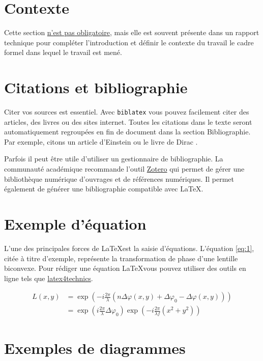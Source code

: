 \documentclass[
    iai, %
    eai, %
]{heig-tb}
\begin{document}
\section{Contexte}
Cette section \underline{n'est pas obligatoire}, mais elle est souvent présente dans un rapport technique pour compléter l'introduction et définir le contexte du travail \cad le cadre formel dans lequel le travail est mené.

\section{Citations et bibliographie}
Citer vos sources est essentiel. Avec \texttt{biblatex} vous pouvez facilement citer des articles, des livres ou des sites internet. Toutes les citations dans le texte seront automatiquement regroupées en fin de document dans la section \guillemotleft Bibliographie\guillemotright. Par exemple, citons un article d'Einstein \cite{einstein} ou le livre de Dirac \cite{dirac}.

Parfois il peut être utile d'utiliser un gestionnaire de bibliographie. La communauté académique recommande l'outil \href{https://www.zotero.org/}{Zotero} qui permet de gérer une bibliothèque numérique d'ouvrages et de références numériques. Il permet également de générer une bibliographie compatible avec \LaTeX.

\section{Exemple d'équation}
L'une des principales forces de \LaTeX est la saisie d'équations. L'équation \ref{eq:1}, citée à titre d'exemple, représente la transformation de phase d'une lentille biconvexe. Pour rédiger une équation \LaTeX vous pouvez utiliser des outils en ligne tels que \href{https://www.latex4technics.com/}{latex4technics}.

\begin{equation} \label{eq:1}
  \begin{split}
    L(x,y) &= \exp\left( - i\frac{{2\pi }}{\lambda }\left( {n\Delta \varphi (x,y) + \Delta {\varphi _0} - \Delta \varphi (x,y)} \right)\right)\\
    &= {\exp\left({i\frac{{2\pi }}{\lambda }\Delta {\varphi _0}}\right)}{\exp\left({ - i\frac{{2\pi }}{{\lambda f}}({x^2} + {y^2})}\right)}
  \end{split}
\end{equation}

\section{Exemples de diagrammes}
\end{document}
